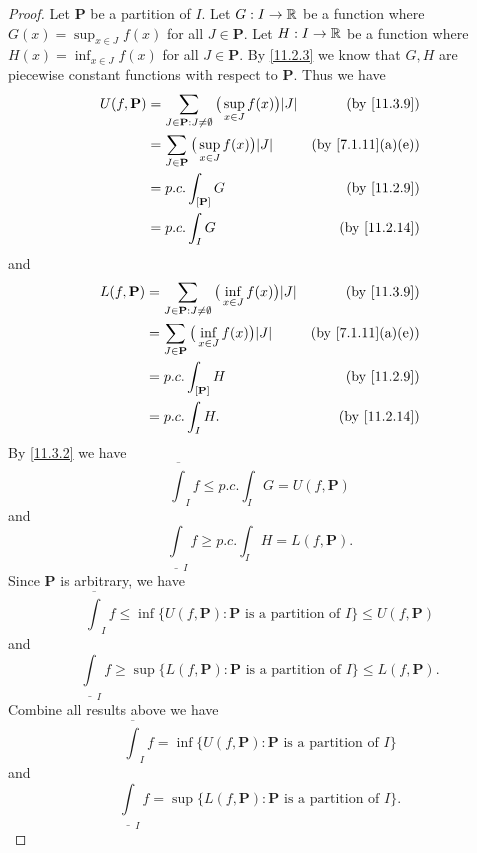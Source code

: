 \begin{proof}
  Let \(\mathbf{P}\) be a partition of \(I\).
  Let \(G : I \to \mathbb{R}\) be a function where \(G(x) = \sup_{x \in J} f(x)\) for all \(J \in \mathbf{P}\).
  Let \(H : I \to \mathbb{R}\) be a function where \(H(x) = \inf_{x \in J} f(x)\) for all \(J \in \mathbf{P}\).
  By \cref{11.2.3} we know that \(G, H\) are piecewise constant functions with respect to \(\mathbf{P}\).
  Thus we have
  \begin{align*}
    U(f, \mathbf{P}) & = \sum_{J \in \mathbf{P} : J \neq \emptyset} \big(\sup_{x \in J} f(x)\big) \abs{J} & \text{(by \cref{11.3.9})}       \\
                     & = \sum_{J \in \mathbf{P}} \big(\sup_{x \in J} f(x)\big) \abs{J}                    & \text{(by \cref{7.1.11}(a)(e))} \\
                     & = p.c. \int_{[\mathbf{P}]} G                                                       & \text{(by \cref{11.2.9})}       \\
                     & = p.c. \int_I G                                                                    & \text{(by \cref{11.2.14})}
  \end{align*}
  and
  \begin{align*}
    L(f, \mathbf{P}) & = \sum_{J \in \mathbf{P} : J \neq \emptyset} \big(\inf_{x \in J} f(x)\big) \abs{J} & \text{(by \cref{11.3.9})}       \\
                     & = \sum_{J \in \mathbf{P}} \big(\inf_{x \in J} f(x)\big) \abs{J}                    & \text{(by \cref{7.1.11}(a)(e))} \\
                     & = p.c. \int_{[\mathbf{P}]} H                                                       & \text{(by \cref{11.2.9})}       \\
                     & = p.c. \int_I H.                                                                   & \text{(by \cref{11.2.14})}
  \end{align*}
  By \cref{11.3.2} we have
  \[
    \overline{\int}_I f \leq p.c. \int_I G = U(f, \mathbf{P})
  \]
  and
  \[
    \underline{\int}_I f \geq p.c. \int_I H = L(f, \mathbf{P}).
  \]
  Since \(\mathbf{P}\) is arbitrary, we have
  \[
    \overline{\int}_I f \leq \inf\big\{U(f, \mathbf{P}) : \mathbf{P} \text{ is a partition of } I\big\} \leq U(f, \mathbf{P})
  \]
  and
  \[
    \underline{\int}_I f \geq \sup\big\{L(f, \mathbf{P}) : \mathbf{P} \text{ is a partition of } I\big\} \leq L(f, \mathbf{P}).
  \]
  Combine all results above we have
  \[
    \overline{\int}_I f = \inf\big\{U(f, \mathbf{P}) : \mathbf{P} \text{ is a partition of } I\big\}
  \]
  and
  \[
    \underline{\int}_I f = \sup\big\{L(f, \mathbf{P}) : \mathbf{P} \text{ is a partition of } I\big\}.
  \]
\end{proof}

